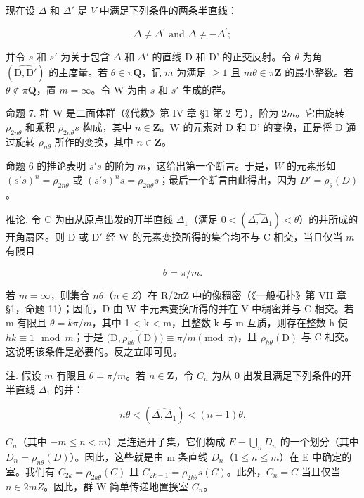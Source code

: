 现在设 \(\Delta\) 和 \(\Delta'\) 是 \(V\) 中满足下列条件的两条半直线：

\[
\Delta \neq \Delta^ {\prime} \text { and } \Delta \neq - \Delta^ {\prime};
\]

并令 \(s\) 和 \(s'\) 为关于包含 \(\Delta\) 和 \(\Delta'\) 的直线 D 和 D' 的正交反射。令 \(\theta\) 为角 \((\widehat{\mathrm{D},\mathrm{D}'})\) 的主度量。若 \(\theta \in \pi\mathbf{Q}\)，记 \(m\) 为满足 \(\geqslant 1\) 且 \(m\theta \in \pi\mathbf{Z}\) 的最小整数。若 \(\theta \notin \pi\mathbf{Q}\)，置 \(m = \infty\)。令 W 为由 \(s\) 和 \(s'\) 生成的群。

命题 7. 群 W 是二面体群（《代数》第 IV 章 §1 第 2 号），阶为 \(2m\)。它由旋转 \(\rho_{2n\theta}\) 和乘积 \(\rho_{2n\theta}s\) 构成，其中 \(n \in \mathbf{Z}\)。W 的元素对 D 和 D' 的变换，正是将 D 通过旋转 \(\rho_{n\theta}\) 所作的变换，其中 \(n \in \mathbf{Z}\)。

命题 6 的推论表明 \(s's\) 的阶为 \(m\)，这给出第一个断言。于是，\(W\) 的元素形如 \((s's)^n = \rho_{2n\theta}\) 或 \((s's)^n s = \rho_{2n\theta}s\)；最后一个断言由此得出，因为 \(D' = \rho_\theta(D)\)。

推论. 令 C 为由从原点出发的开半直线 \(\Delta_{1}\)（满足 \(0 < (\widehat{\Delta, \Delta_{1}}) < \theta\)）的并所成的开角扇区。则 D 或 \(\mathrm{D}'\) 经 W 的元素变换所得的集合均不与 C 相交，当且仅当 \(m\) 有限且

\[
\theta = \pi / m.
\]

若 \(m = \infty\)，则集合 \(n\theta\)（\(n \in Z\)）在 R/2πZ 中的像稠密（《一般拓扑》第 VII 章 §1，命题 11）；因而，D 由 W 中元素变换所得的并在 V 中稠密并与 C 相交。若 m 有限且 \(\theta = k\pi/m\)，其中 1 \textless{} k \textless{} m，且整数 k 与 m 互质，则存在整数 h 使 \(hk \equiv 1 \mod m\)；于是 \((\widehat{\mathrm{D}, \rho_{h\theta}(\mathrm{D}))} \equiv \pi/m \pmod{\pi}\)，且 \(\rho_{h\theta}(\mathrm{D})\) 与 C 相交。这说明该条件是必要的。反之立即可见。

注. 假设 \(m\) 有限且 \(\theta = \pi / m\)。若 \(n \in \mathbf{Z}\)，令 \(C_n\) 为从 0 出发且满足下列条件的开半直线 \(\Delta_1\) 的并：

\[
n \theta <   (\widehat {\Delta , \Delta_ {1}}) <   (n + 1) \theta .
\]

\(C_{n}\)（其中 \(-m \leqslant n < m\)）是连通开子集，它们构成 \(E - \bigcup_{n} D_{n}\) 的一个划分（其中 \(D_{n} = \rho_{n\theta}(D)\)）。因此，这些就是由 m 条直线 \(D_{n}\)（\(1 \leqslant n \leqslant m\)）在 E 中确定的室。我们有 \(C_{2k} = \rho_{2k\theta}(C)\) 且 \(C_{2k-1} = \rho_{2k\theta}s(C)\)。此外，\(C_{n} = C\) 当且仅当 \(n \in 2mZ\)。因此，群 W 简单传递地置换室 \(C_{n}\)。

